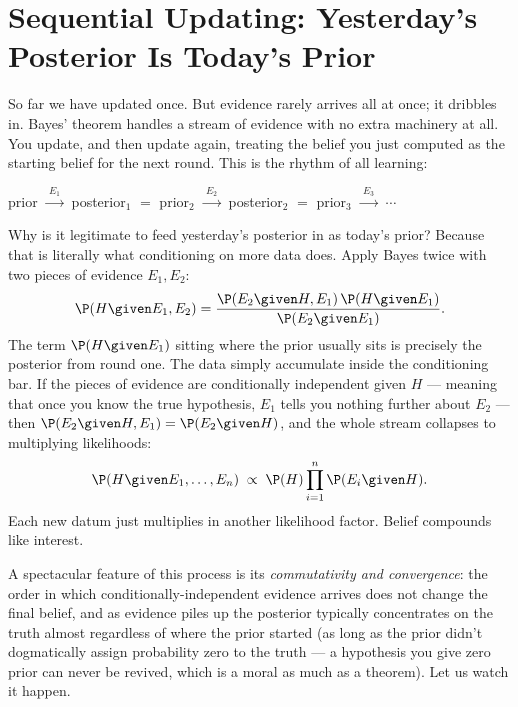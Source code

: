 \section{Sequential Updating: Yesterday's Posterior Is Today's Prior}
\label{ch05:sequential}

So far we have updated once. But evidence rarely arrives all at once; it dribbles in.
Bayes' theorem handles a stream of evidence with no extra machinery
at all. You update, and then update again, treating the belief you just computed as
the starting belief for the next round. This is the rhythm of all learning:

\begin{center}
prior $\xrightarrow{\;E_1\;}$ posterior$_1$ $=$ prior$_2$
$\xrightarrow{\;E_2\;}$ posterior$_2$ $=$ prior$_3$
$\xrightarrow{\;E_3\;}$ $\cdots$
\end{center}

\begin{whybox}
Why is it legitimate to feed yesterday's posterior in as today's prior? Because that is
literally what conditioning on more data does. Apply Bayes twice with two pieces of
evidence $E_1, E_2$:
\[
  \P(H \given E_1, E_2) = \frac{\P(E_2 \given H, E_1)\,\P(H \given E_1)}{\P(E_2\given E_1)}.
\]
The term $\P(H \given E_1)$ sitting where the prior usually sits is precisely the
posterior from round one. The data simply accumulate inside the conditioning bar. If the
pieces of evidence are conditionally independent given $H$ --- meaning that once you know
the true hypothesis, $E_1$ tells you nothing further about $E_2$ --- then
$\P(E_2 \given H, E_1) = \P(E_2 \given H)$, and the whole stream collapses to multiplying
likelihoods:
\[
  \P(H \given E_1, \dots, E_n) \;\propto\; \P(H)\prod_{i=1}^{n}\P(E_i \given H).
\]
Each new datum just multiplies in another likelihood factor. Belief compounds like
interest.
\end{whybox}

A spectacular feature of this process is its \emph{commutativity and convergence}: the
order in which conditionally-independent evidence arrives does not change the final
belief, and as evidence piles up the posterior typically concentrates on the truth almost
regardless of where the prior started (as long as the prior didn't dogmatically assign
probability zero to the truth --- a hypothesis you give zero prior can never be revived,
which is a moral as much as a theorem). Let us watch it happen.

